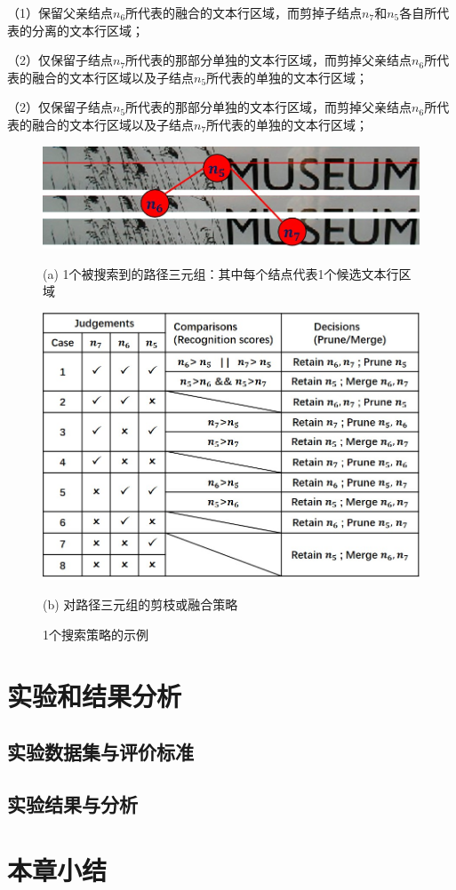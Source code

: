         （1）保留父亲结点$n_6$所代表的融合的文本行区域，而剪掉子结点$n_7$和$n_5$各自所代表的分离的文本行区域；
        
        （2）仅保留子结点$n_7$所代表的那部分单独的文本行区域，而剪掉父亲结点$n_6$所代表的融合的文本行区域以及子结点$n_5$所代表的单独的文本行区域；
        
        （2）仅保留子结点$n_5$所代表的那部分单独的文本行区域，而剪掉父亲结点$n_6$所代表的融合的文本行区域以及子结点$n_7$所代表的单独的文本行区域；

        \begin{figure}[htbp]
        \centering
        \includegraphics[width=\textwidth]{./figures/c4_search_strategy1.jpg}
        \centerline{\small (a) 1个被搜索到的路径三元组：其中每个结点代表1个候选文本行区域 }
        \includegraphics[width=\textwidth]{./figures/c4_search_strategy2.jpg}
        \centerline{\small (b) 对路径三元组的剪枝或融合策略}
        \caption{ 1个搜索策略的示例}
        \label{fig.c4_search_strategy}
        \end{figure}

    \section{实验和结果分析}

        \subsection{实验数据集与评价标准}

        \subsection{实验结果与分析}

    \section{本章小结}


